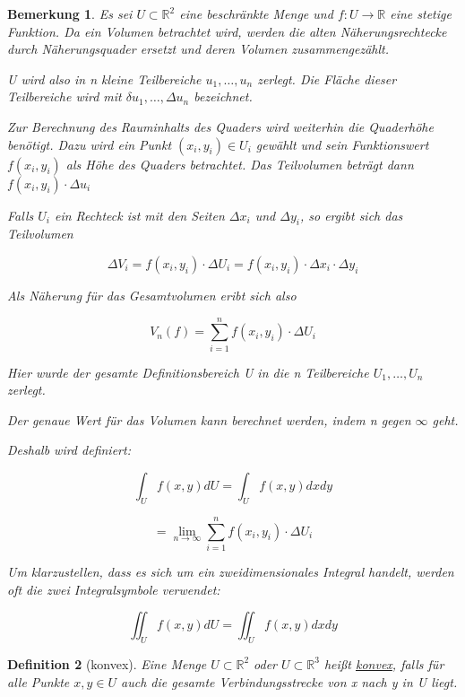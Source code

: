 \documentclass[fontset=ubuntu,12pt,a4paper]{scrreprt}
\newtheorem{defi}{Definition}[section]
\newtheorem{bemerkung}[defi]{Bemerkung}
\begin{document}
    \begin{bemerkung}
        Es sei \(U\subset \mathbb{R}^2\) eine beschränkte Menge und \(f:U\to \mathbb{R}\) eine stetige Funktion. Da ein Volumen betrachtet wird, werden die alten Näherungsrechtecke durch Näherungsquader ersetzt und deren Volumen zusammengezählt.

        U wird also in n kleine Teilbereiche \(u_1,\dots,u_n\) zerlegt. Die Fläche dieser Teilbereiche wird mit \(\delta u_1,\dots,\Delta u_n\) bezeichnet.

        Zur Berechnung des Rauminhalts des Quaders wird weiterhin die Quaderhöhe benötigt. Dazu wird ein Punkt \((x_i,y_i)\in U_i\) gewählt und sein Funktionswert \(f(x_i,y_i)\) als Höhe des Quaders betrachtet. Das Teilvolumen beträgt dann \(f(x_i,y_i)\cdot\Delta u_i\)

        Falls \(U_i\) ein Rechteck ist mit den Seiten \(\Delta x_i\) und \(\Delta y_i\), so ergibt sich das Teilvolumen
        
        \[\Delta V_i = f(x_i,y_i)\cdot \Delta U_i=f(x_i,y_i)\cdot \Delta x_i\cdot \Delta y_i\]

        Als Näherung für das Gesamtvolumen eribt sich also

        \[V_n(f)=\sum^{n}_{i=1} f(x_i,y_i)\cdot\Delta U_i\]

        Hier wurde der gesamte Definitionsbereich U in die n Teilbereiche \(U_1,\dots,U_n\) zerlegt.

        Der genaue Wert für das Volumen kann berechnet werden, indem n gegen \(\infty\) geht.

        Deshalb wird definiert:

        \[\int_{U} f(x,y)dU=\int_{U} f(x,y)dxdy\]

        \[= \lim_{n\to\infty} \sum^{n}_{i=1} f(x_i,y_i)\cdot\Delta U_i\]

        Um klarzustellen, dass es sich um ein zweidimensionales Integral handelt, werden oft die zwei Integralsymbole verwendet:

        \[\iint_{U} f(x,y)dU=\iint_{U} f(x,y)dxdy\]
    \end{bemerkung}

    \begin{defi}[konvex]
        Eine Menge \(U\subset\mathbb{R}^2\) oder \(U\subset\mathbb{R}^3\) heißt \underline{konvex}, falls für alle Punkte \(x,y\in U\) auch die gesamte Verbindungsstrecke von x nach y in U liegt.
    \end{defi}
\end{document}
